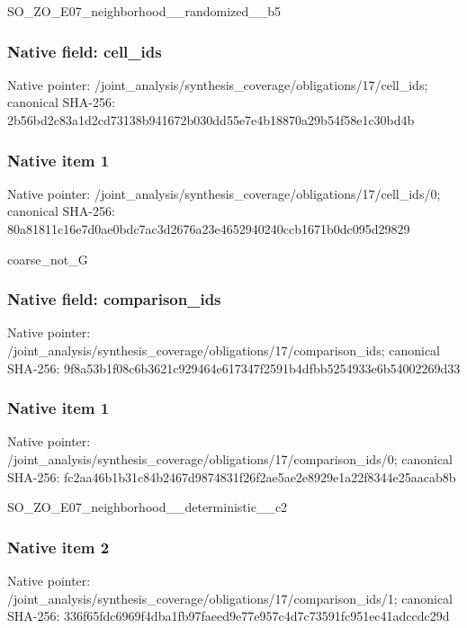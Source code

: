 \documentclass[10pt,a4paper]{article}
\begin{document}
\begingroup\raggedright\sloppy SO\_\allowbreak{}ZO\_\allowbreak{}E07\_\allowbreak{}neighborhood\_\allowbreak{}\_\allowbreak{}randomized\_\allowbreak{}\_\allowbreak{}b5\par\endgroup

\subsubsection{Native field: cell\_\allowbreak{}ids}
Native pointer: /joint\_\allowbreak{}analysis/synthesis\_\allowbreak{}coverage/obligations/17/cell\_\allowbreak{}ids; canonical SHA-256: 2b56bd2c83a1d2cd73138b941672b030dd55e7e4b18870a29b54f58e1c30bd4b

\subsubsection{Native item 1}
Native pointer: /joint\_\allowbreak{}analysis/synthesis\_\allowbreak{}coverage/obligations/17/cell\_\allowbreak{}ids/0; canonical SHA-256: 80a81811c16e7d0ae0bdc7ac3d2676a23e4652940240ccb1671b0dc095d29829

\begingroup\raggedright\sloppy coarse\_\allowbreak{}not\_\allowbreak{}G\par\endgroup

\subsubsection{Native field: comparison\_\allowbreak{}ids}
Native pointer: /joint\_\allowbreak{}analysis/synthesis\_\allowbreak{}coverage/obligations/17/comparison\_\allowbreak{}ids; canonical SHA-256: 9f8a53b1f08c6b3621c929464e617347f2591b4dfbb5254933e6b54002269d33

\subsubsection{Native item 1}
Native pointer: /joint\_\allowbreak{}analysis/synthesis\_\allowbreak{}coverage/obligations/17/comparison\_\allowbreak{}ids/0; canonical SHA-256: fc2aa46b1b31c84b2467d9874831f26f2ae5ae2e8929e1a22f8344e25aacab8b

\begingroup\raggedright\sloppy SO\_\allowbreak{}ZO\_\allowbreak{}E07\_\allowbreak{}neighborhood\_\allowbreak{}\_\allowbreak{}deterministic\_\allowbreak{}\_\allowbreak{}c2\par\endgroup

\subsubsection{Native item 2}
Native pointer: /joint\_\allowbreak{}analysis/synthesis\_\allowbreak{}coverage/obligations/17/comparison\_\allowbreak{}ids/1; canonical SHA-256: 336f65fdc6969f4dba1fb97faeed9e77e957c4d7c73591fc951ec41adccdc29d
\end{document}
